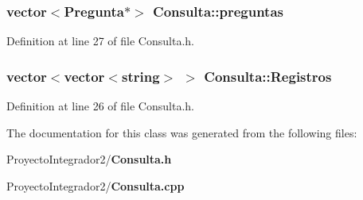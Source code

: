 \subsubsection[{preguntas}]{\setlength{\rightskip}{0pt plus 5cm}vector$<${\bf Pregunta}$\ast$$>$ Consulta\-::preguntas\hspace{0.3cm}{\ttfamily [private]}}\label{class_consulta_a71abff7d94e9294e397319203433bb4d}


Definition at line 27 of file Consulta.\-h.

\subsubsection[{Registros}]{\setlength{\rightskip}{0pt plus 5cm}vector$<$vector$<$string$>$ $>$ Consulta\-::\-Registros\hspace{0.3cm}{\ttfamily [private]}}\label{class_consulta_a3b014f1cb3635323fea65437c4ba7535}


Definition at line 26 of file Consulta.\-h.



The documentation for this class was generated from the following files\-:\begin{DoxyCompactItemize}
\item 
Proyecto\-Integrador2/{\bf Consulta.\-h}\item 
Proyecto\-Integrador2/{\bf Consulta.\-cpp}\end{DoxyCompactItemize}

